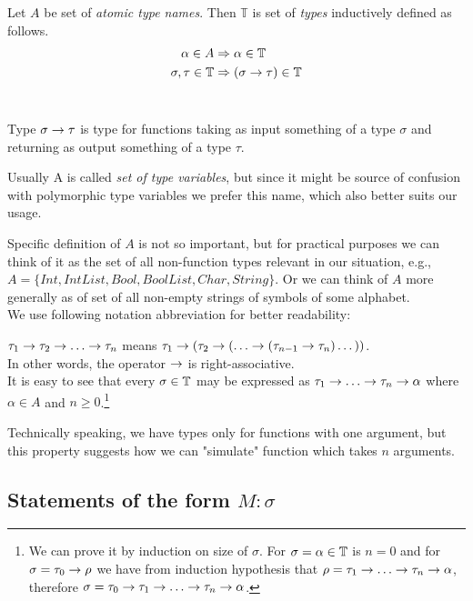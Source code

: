 \documentclass[12pt,a4paper]{report}
\begin{document}
\begin{definition}
Let $A$ be set of {\it atomic type names}. 
Then $\mathbb{T}$ is set of {\it types} inductively defined as follows.
\begin{align*}
\alpha      \in A  &\Rightarrow   \alpha \in \mathbb{T} \\
\sigma,\tau \in \mathbb{T} &\Rightarrow ( \sigma \rightarrow  \tau ) \in \mathbb{T} 
\end{align*}~

\end{definition}

Type $\sigma \rightarrow \tau$ is type for functions taking as input
something of a type $\sigma$ and returning 
as output something of a type $\tau$. 

Usually A is called \textit{set of type variables}, 
but since it might be source of confusion with polymorphic type variables
we prefer this name, which also better suits our usage. 

Specific definition of $A$ is not so important, but for practical purposes 
we can think of it as the set of all non-function types relevant in our
situation, e.g., $A = \{ Int , IntList , Bool, BoolList , Char, String \}$.
Or we can think of $A$ more generally as of set of all non-empty strings
of symbols of some alphabet. \\

We use following notation
abbreviation for better readability:

$\tau_1 \ar \tau_2 \ar \dots \ar \tau_n$ means 
$\tau_1 \ar (\tau_2 \ar (\dots \ar (\tau_{n-1} \ar \tau_n)\dots))$.\\

In other words, the operator $\rightarrow$ is right-associative.\\

It is easy to see that every $\sigma \in \mathbb{T}$ may be expressed as 
$\tau_1 \ar \dots \ar \tau_n \ar \alpha$ 
where $\alpha \in A$ and $n \geq 0$.\footnote{ 
We can prove it by induction on size of $\sigma$. 
For $\sigma = \alpha \in \mathbb{T}$ is $n = 0$ and for $\sigma = \tau_0 \rightarrow \rho$
we have from induction hypothesis that $\rho = \tau_1 \ar \dots \ar \tau_n \ar \alpha$,
therefore
$\sigma = \tau_0 \ar \tau_1 \ar \dots \ar \tau_n \ar \alpha$.}

Technically speaking, we have types only for functions with one argument, but
this property suggests how we can "simulate" function which takes $n$ arguments.
  

	
\subsection{Statements of the form $M : \sigma$}
\end{document}

